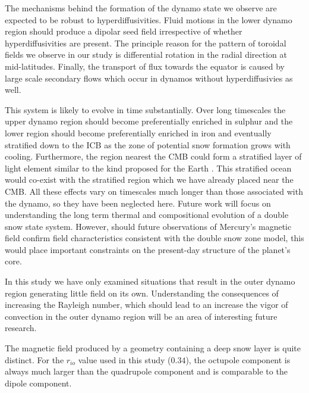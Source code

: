 The mechanisms behind the formation of the dynamo state we observe are expected to be robust to hyperdiffusivities. Fluid motions in the lower dynamo region should produce a dipolar seed field irrespective of whether hyperdiffusivities are present. The principle reason for the pattern of toroidal fields we observe in our study is differential rotation in the radial direction at mid-latitudes. Finally, the transport of flux towards the equator is caused by large scale secondary flows which occur in dynamos without hyperdiffusivies as well. 

This system is likely to evolve in time substantially. Over long timescales the upper dynamo region should become preferentially enriched in sulphur and the lower region should become preferentially enriched in iron and eventually stratified down to the ICB as the zone of potential snow formation grows with cooling. Furthermore, the region nearest the CMB could form a stratified layer of light element similar to the kind proposed for the Earth \citep{Braginsky2006}. This stratified ocean would co-exist with the stratified region which we have already placed near the CMB. All these effects vary on timescales much longer than those associated with the dynamo, so they have been neglected here. Future work will focus on understanding the long term thermal and compositional evolution of a double snow state system. However, should future observations of Mercury's magnetic field confirm field characteristics consistent with the double snow zone model, this would place important constraints on the present-day structure of the planet's core.

In this study we have only examined situations that result in the outer dynamo region generating little field on its own. Understanding the consequences of increasing the Rayleigh number, which should lead to an increase the vigor of convection in the outer dynamo region will be an area of interesting future research.

The magnetic field produced by a geometry containing a deep snow layer is quite distinct. For the $r_{io}$ value used in this study ($0.34$), the octupole component is always much larger than the quadrupole component and is comparable to the dipole component.

















